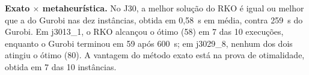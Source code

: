 \textbf{Exato $\times$ metaheurística.} No J30, a melhor solução do RKO é igual ou melhor que a do
Gurobi nas dez instâncias, obtida em 0,58~s em média, contra 259~s do Gurobi. Em j3013\_1, o RKO
alcançou o ótimo (58) em 7 das 10 execuções, enquanto o Gurobi terminou em 59 após 600~s; em
j3029\_8, nenhum dos dois atingiu o ótimo (80). A vantagem do método exato está na prova de
otimalidade, obtida em 7 das 10 instâncias.

